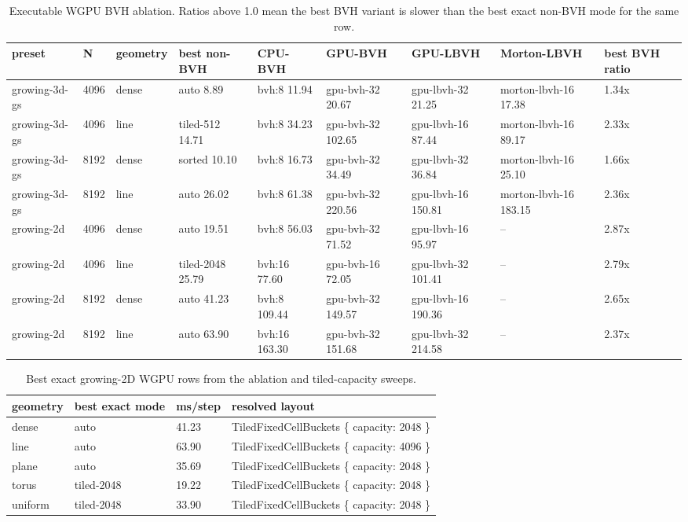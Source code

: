 \documentclass[10pt,twocolumn]{article}
\begin{document}
\begin{table}[t]
\centering
\small
\begin{tabular}{lllllllll}
\toprule
preset & N & geometry & best non-BVH & CPU-BVH & GPU-BVH & GPU-LBVH & Morton-LBVH & best BVH ratio \\
\midrule
growing-3d-gs & 4096 & dense & auto 8.89 & bvh:8 11.94 & gpu-bvh-32 20.67 & gpu-lbvh-32 21.25 & morton-lbvh-16 17.38 & 1.34x \\
growing-3d-gs & 4096 & line & tiled-512 14.71 & bvh:8 34.23 & gpu-bvh-32 102.65 & gpu-lbvh-16 87.44 & morton-lbvh-16 89.17 & 2.33x \\
growing-3d-gs & 8192 & dense & sorted 10.10 & bvh:8 16.73 & gpu-bvh-32 34.49 & gpu-lbvh-32 36.84 & morton-lbvh-16 25.10 & 1.66x \\
growing-3d-gs & 8192 & line & auto 26.02 & bvh:8 61.38 & gpu-bvh-32 220.56 & gpu-lbvh-16 150.81 & morton-lbvh-16 183.15 & 2.36x \\
growing-2d & 4096 & dense & auto 19.51 & bvh:8 56.03 & gpu-bvh-32 71.52 & gpu-lbvh-16 95.97 & -- & 2.87x \\
growing-2d & 4096 & line & tiled-2048 25.79 & bvh:16 77.60 & gpu-bvh-16 72.05 & gpu-lbvh-32 101.41 & -- & 2.79x \\
growing-2d & 8192 & dense & auto 41.23 & bvh:8 109.44 & gpu-bvh-32 149.57 & gpu-lbvh-16 190.36 & -- & 2.65x \\
growing-2d & 8192 & line & auto 63.90 & bvh:16 163.30 & gpu-bvh-32 151.68 & gpu-lbvh-32 214.58 & -- & 2.37x \\
\bottomrule
\end{tabular}
\caption{Executable WGPU BVH ablation. Ratios above 1.0 mean the best BVH variant is slower than the best exact non-BVH mode for the same row.}
\label{tab:bvhgpu}
\end{table}

\begin{table}[t]
\centering
\small
\begin{tabular}{llll}
\toprule
geometry & best exact mode & ms/step & resolved layout \\
\midrule
dense & auto & 41.23 & TiledFixedCellBuckets \{ capacity: 2048 \} \\
line & auto & 63.90 & TiledFixedCellBuckets \{ capacity: 4096 \} \\
plane & auto & 35.69 & TiledFixedCellBuckets \{ capacity: 2048 \} \\
torus & tiled-2048 & 19.22 & TiledFixedCellBuckets \{ capacity: 2048 \} \\
uniform & tiled-2048 & 33.90 & TiledFixedCellBuckets \{ capacity: 2048 \} \\
\bottomrule
\end{tabular}
\caption{Best exact growing-2D WGPU rows from the ablation and tiled-capacity sweeps.}
\label{tab:growing2d}
\end{table}
\end{document}
